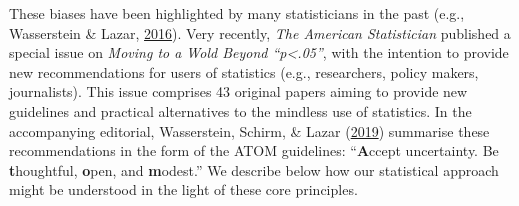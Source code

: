 \documentclass[a4paper,12pt,twoside,openright,oldfontcommands]{memoir}
\begin{document}
These biases have been highlighted by many statisticians in the past
(e.g., Wasserstein \& Lazar,
\protect\hyperlink{ref-wasserstein_asas_2016}{2016}). Very recently,
\emph{The American Statistician} published a special issue on
\emph{Moving to a Wold Beyond ``p\textless{}.05''}, with the intention
to provide new recommendations for users of statistics (e.g.,
researchers, policy makers, journalists). This issue comprises 43
original papers aiming to provide new guidelines and practical
alternatives to the mindless use of statistics. In the accompanying
editorial, Wasserstein, Schirm, \& Lazar
(\protect\hyperlink{ref-wasserstein_moving_2019}{2019}) summarise these
recommendations in the form of the ATOM guidelines: ``\textbf{A}ccept
uncertainty. Be \textbf{t}houghtful, \textbf{o}pen, and
\textbf{m}odest.'' We describe below how our statistical approach might
be understood in the light of these core principles.
\end{document}
